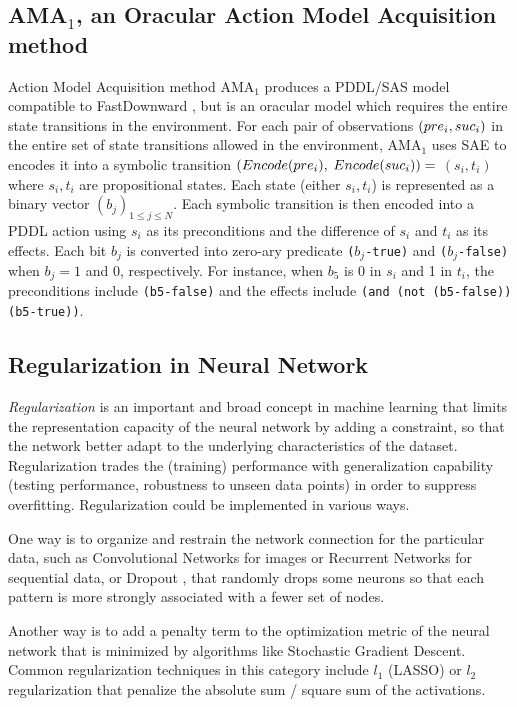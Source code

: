 \subsection{AMA$_1$, an Oracular Action Model Acquisition method}

Action Model Acquisition method AMA$_1$ produces a PDDL/SAS model compatible to
FastDownward \cite{Helmert04}, but is an oracular model which requires the entire state transitions
in the environment.
For each pair of observations ${\left(pre_i, suc_i\right)}$ in the entire set of state transitions allowed in the environment,
AMA$_1$ uses SAE to encodes it into 
a symbolic transition $(Encode(pre_i),$ $Encode(suc_i))=$ $(s_i,t_i)$ where $s_i,t_i$ are propositional states.
Each state (either $s_i,t_i$) is represented as a binary vector $(b_j)_{1\leq j \leq N}$.
Each symbolic transition is then encoded into a PDDL action 
using $s_i$ as its preconditions and the difference of $s_i$ and $t_i$ as its effects.
Each bit $b_j$ is converted into zero-ary predicate \texttt{($b_j$-true)} and \texttt{($b_j$-false)}
when $b_j=1$ and $0$, respectively.
For instance, when $b_5$ is 0 in $s_i$ and 1 in $t_i$,
the preconditions include \texttt{(b5-false)} and
the effects include \texttt{(and (not (b5-false)) (b5-true))}.

\subsection{Regularization in Neural Network}

\emph{Regularization} is an important and broad concept in machine learning
that limits the representation capacity of the neural network by adding a constraint,
so that the network better adapt to the underlying characteristics of the dataset.
Regularization trades the (training) performance with generalization capability (testing performance, robustness to
unseen data points) in order to suppress overfitting.
Regularization could be implemented in various ways.

One way is to organize and restrain the network connection for the particular data,
such as Convolutional Networks for images
or Recurrent Networks for sequential data, or
Dropout \cite{srivastava2014dropout}, that randomly drops some neurons so
that each pattern is more strongly associated with a fewer set of nodes.

Another way is to add a penalty term to the optimization metric of the
neural network that is minimized by algorithms like Stochastic
Gradient Descent.
Common regularization techniques in this category include
$l_1$ (LASSO) or $l_2$ regularization that penalize the absolute sum / square sum of the
activations.

